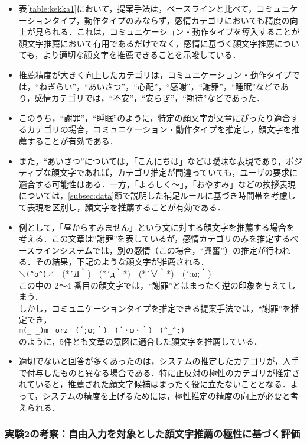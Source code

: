 \documentclass[japanese]{jnlp_1.4}
\begin{document}
\begin{itemize}
\item 表\ref{table:kekka1}において，提案手法は，ベースラインと比べて，コミュニケーションタイプ，動作タイプのみならず，感情カテゴリにおいても精度の向上が見られる．これは，コミュニケーション・動作タイプを導入することが顔文字推薦において有用であるだけでなく，感情に基づく顔文字推薦についても，より適切な顔文字を推薦できることを示唆している．
\item 推薦精度が大きく向上したカテゴリは，コミュニケーション・動作タイプでは，``ねぎらい''，``あいさつ''，``心配''，``感謝''，``謝罪''，``睡眠''などであり，感情カテゴリでは，\mbox{``不}安''，``安らぎ''，``期待''などであった．
\item このうち，``謝罪''，``睡眠''のように，特定の顔文字が文章にぴったり適合するカテゴリの場合，コミュニケーション・動作タイプを推定し，顔文字を推薦することが有効である．
\item また，``あいさつ''については，「こんにちは」などは曖昧な表現であり，ポジティブな顔文字であれば，カテゴリ推定が間違っていても，ユーザの要求に適合する可能性はある．一方，「よろしく〜」，「おやすみ」などの挨拶表現については，\ref{subsec:data}節で説明した補足ルールに基づき時間帯を考慮して表現を区別し，顔文字を推薦することが有効である．
\item 例として，「昼からすみません」という文に対する顔文字を推薦する場合を考える．この文章は``謝罪''を表しているが，感情カテゴリのみを推定するベースラインシステムでは，別の感情（この場合，``興奮''）の推定が行われる．その結果，下記のような顔文字が推薦される．\\
\verb|＼(^o^)／|　(*´Д｀)　(*´д｀*)　(*´∀｀*)　(´;ω;｀)\\
この中の 2〜4 番目の顔文字では，``謝罪''とはまったく逆の印象を与えてしまう．\\
しかし，コミュニケーションタイプを推定できる提案手法では，``謝罪''を推定でき，\\
\verb|m(_ _)m　orz　(´;ω;｀)　(´・ω・｀)　(^_^;)|\\
のように，5件とも文章の意図に適合した顔文字を推薦している．
\item 適切でないと回答が多くあったのは，システムの推定したカテゴリが，人手で付与したものと異なる場合である．特に正反対の極性のカテゴリが推定されていると，推薦された顔文字候補はまったく役に立たないこととなる．よって，システムの精度を上げるためには，極性推定の精度の向上が必要と考えられる．
\end{itemize}


\subsubsection*{実験2の考察：自由入力を対象とした顔文字推薦の極性に基づく評価}
\end{document}
